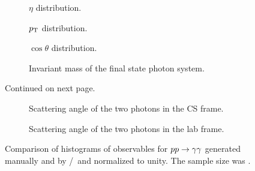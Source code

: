 \begin{figure}[hp]
  \centering
  \begin{subfigure}{.49\textwidth}
    \centering {}
    \caption{\label{fig:pdf-eta} \(\eta\) distribution.}
  \end{subfigure}
  \begin{subfigure}{.49\textwidth}
    \centering {}
    \caption{\label{fig:pdf-pt} \(p_\mathrm{T}\) distribution.}
  \end{subfigure}
  \begin{subfigure}{.49\textwidth}
    \centering {}
    \caption{\label{fig:pdf-cos-theta} \(\cos\theta\) distribution.}
  \end{subfigure}
  \begin{subfigure}{.49\textwidth}
    \centering {}
    \caption[Histogram of the invariant mass of the final state photon
    system.]{\label{fig:pdf-inv-m} Invariant mass of the
      final state photon system. %
    }
  \end{subfigure}
  \caption{Continued on next page.}
\end{figure}
%
\begin{figure}
  \ContinuedFloat
  \begin{subfigure}{.49\textwidth}
    \centering {}
    \caption{\label{fig:pdf-o-angle-cs} Scattering angle of the two
      photons in the CS frame.}
  \end{subfigure}
  \begin{subfigure}{.49\textwidth}
    \centering {}
    \caption{\label{fig:pdf-o-angle} Scattering angle of the two
      photons in the lab frame.}
  \end{subfigure}
  \caption{\label{fig:pdf-histos}Comparison of histograms of
    observables for \(pp\rightarrow\gamma\gamma\) generated manually and by
    \sherpa/\rivet\ and normalized to unity. The sample size was
    \protect {}.}
\end{figure}
%

